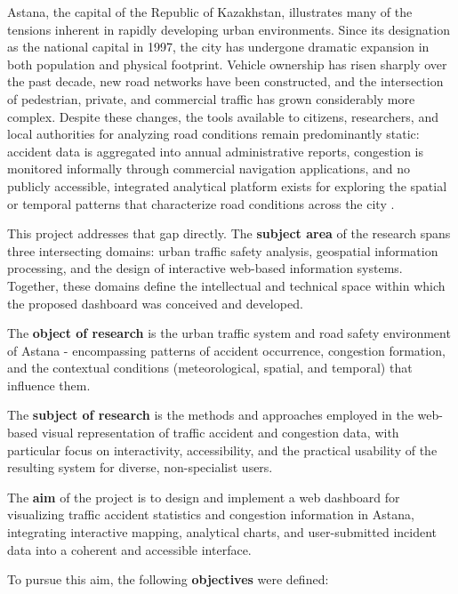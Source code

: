 \documentclass[12pt,a4paper]{report}
\begin{document}
Astana, the capital of the Republic of Kazakhstan, illustrates many of
the tensions inherent in rapidly developing urban environments. Since
its designation as the national capital in 1997, the city has undergone
dramatic expansion in both population and physical footprint. Vehicle
ownership has risen sharply over the past decade, new road networks
have been constructed, and the intersection of pedestrian, private, and
commercial traffic has grown considerably more complex. Despite these
changes, the tools available to citizens, researchers, and local
authorities for analyzing road conditions remain predominantly static:
accident data is aggregated into annual administrative reports,
congestion is monitored informally through commercial navigation
applications, and no publicly accessible, integrated analytical
platform exists for exploring the spatial or temporal patterns that
characterize road conditions across the city \cite{kzstat2023}.

This project addresses that gap directly. The \textbf{subject area} of
the research spans three intersecting domains: urban traffic safety
analysis, geospatial information processing, and the design of
interactive web-based information systems. Together, these domains
define the intellectual and technical space within which the proposed
dashboard was conceived and developed.

The \textbf{object of research} is the urban traffic system and road
safety environment of Astana - encompassing patterns of accident
occurrence, congestion formation, and the contextual conditions
(meteorological, spatial, and temporal) that influence them.

The \textbf{subject of research} is the methods and approaches employed
in the web-based visual representation of traffic accident and
congestion data, with particular focus on interactivity, accessibility,
and the practical usability of the resulting system for diverse,
non-specialist users.

The \textbf{aim} of the project is to design and implement a web
dashboard for visualizing traffic accident statistics and congestion
information in Astana, integrating interactive mapping, analytical
charts, and user-submitted incident data into a coherent and accessible
interface.

To pursue this aim, the following \textbf{objectives} were defined:
\end{document}
